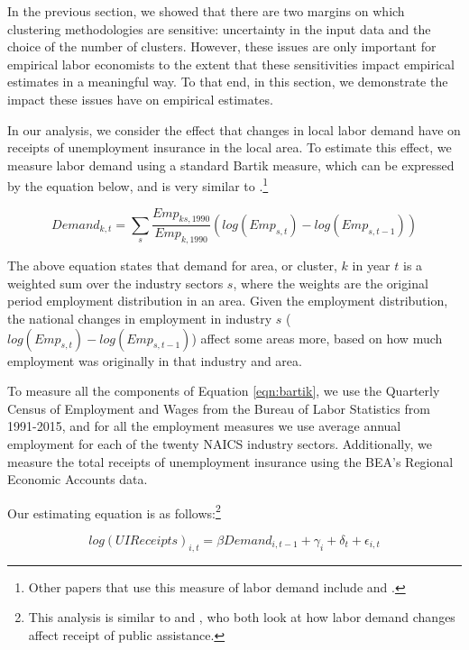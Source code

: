 In the previous section, we showed that there are two margins on which clustering methodologies are sensitive:  uncertainty in the input data and the choice of the number of clusters. However, these issues are only important for empirical labor economists to the extent that these sensitivities impact empirical estimates in a meaningful way. To that end, in this section, we demonstrate the impact these issues have on empirical estimates. 

In our analysis, we consider the effect that changes in local labor demand have on receipts of unemployment insurance in the local area. To estimate this effect, we measure labor demand using a standard Bartik measure, which can be expressed by the equation below, and is very similar to \citet{Bartik1991}.\footnote{Other papers that use this measure of labor demand include \citet{BH2000} and \citet{Notowidigdo2011}.}


\begin{equation}\label{eqn:bartik}
Demand_{k,t} = \sum_{s} \frac{Emp_{ks,1990}}{Emp_{k,1990}} (log(Emp_{s,t}) - log(Emp_{s,t-1}))
\end{equation}

The above equation states that demand for area, or cluster, $k$ in year $t$ is a weighted sum over the industry sectors $s$, where the weights are the original period employment distribution in an area. Given the employment distribution, the national changes in employment in industry $s$ ($log(Emp_{s,t}) - log(Emp_{s,t-1})$) affect some areas more, based on how much employment was originally in that industry and area.

To measure all the components of Equation \ref{eqn:bartik}, we use the Quarterly Census of Employment and Wages from the Bureau of Labor Statistics from 1991-2015, and for all the employment measures we use average annual employment for each of the twenty NAICS industry sectors. Additionally, we measure the total receipts of unemployment insurance using the BEA's Regional Economic Accounts data.

Our estimating equation is as follows:\footnote{This analysis is similar to \citet{ADH2013} and \citet{Notowidigdo2011}, who both look at how labor demand changes affect receipt of public assistance.}

\begin{equation}\label{eqn:bartikreg}
log(UIReceipts)_{i,t} = \beta Demand_{i,t-1} + \gamma_i + \delta_t+ \epsilon_{i,t}
\end{equation}

